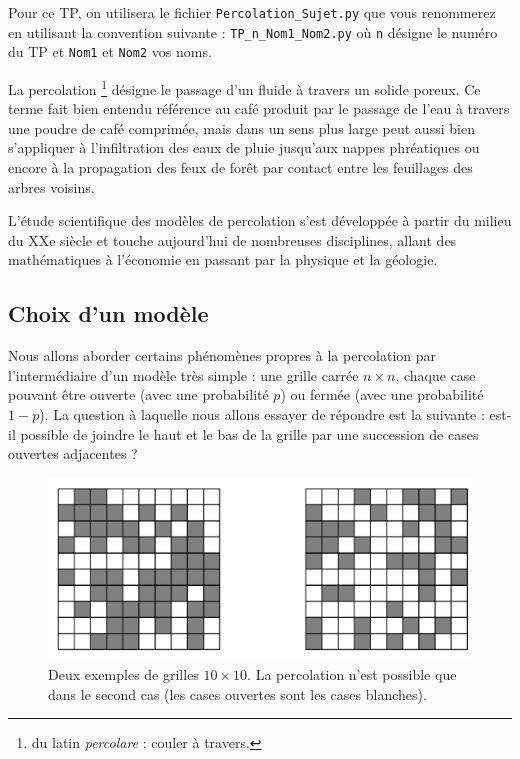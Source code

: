\documentclass[t,10pt]{article}
\begin{document}
\enteteinfo

\graphicspath{{images}}

\setcounter{numques}{0}

Pour ce TP, on utilisera le fichier \texttt{Percolation\_Sujet.py} que vous renommerez en utilisant la convention suivante : 
\texttt{TP\_n\_Nom1\_Nom2.py} où \texttt{n} désigne le numéro du TP et \texttt{Nom1} et \texttt{Nom2} vos noms.

La percolation \footnote{du latin \emph{percolare} : couler à travers.} désigne le passage d'un fluide à
travers un solide poreux. Ce terme fait bien entendu référence au café
produit par le passage de l'eau à travers une poudre de café comprimée,
mais dans un sens plus large peut aussi bien s'appliquer à
l'infiltration des eaux de pluie jusqu'aux nappes phréatiques ou encore
à la propagation des feux de forêt par contact entre les feuillages des
arbres voisins.

L'étude scientifique des modèles de percolation s'est développée à
partir du milieu du XXe siècle et touche aujourd'hui de nombreuses
disciplines, allant des mathématiques à l'économie en passant par la
physique et la géologie.

\subsection*{Choix d'un modèle}\label{choix-dun-modele}


Nous allons aborder certains phénomènes propres à la percolation par
l'intermédiaire d'un modèle très simple : une grille carrée $n\times n$,
chaque case pouvant être ouverte (avec une probabilité $p$) ou
fermée (avec une probabilité $1-p$). La question à laquelle nous
allons essayer de répondre est la suivante : est-il possible de joindre
le haut et le bas de la grille par une succession de cases ouvertes
adjacentes ?

\begin{figure}[H]
\begin{center}
\includegraphics[width=\linewidth]{illustration_perco.jpg}
\caption{Deux exemples de grilles $10\times10$. La percolation
n'est possible que dans le second cas (les cases ouvertes sont les cases
blanches). \label{fig1}}
\end{center}
\end{figure}
\end{document}
